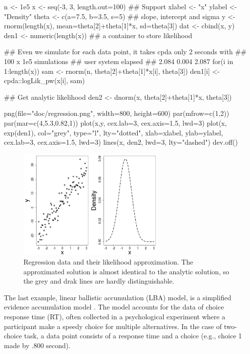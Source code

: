 \documentclass[shortnames,nojss,article]{jss}
\begin{document}
%
\begin{Code}
n      <- 1e5
x      <- seq(-3, 3, length.out=100) ## Support
xlabel <- "x"
ylabel <- "Density"
theta  <- c(a=7.5, b=3.5, s=5)       ## slope, intercept and sigma
y      <- rnorm(length(x), mean=theta[2]+theta[1]*x, sd=theta[3])
dat    <- cbind(x, y)
den1   <- numeric(length(x))         ## a container to store likelihood

## Even we simulate for each data point, it takes cpda only 2 seconds with
## 100 x 1e5 simulations
##   user  system elapsed
##  2.084   0.004   2.087
for(i in 1:length(x)) {
  sam     <- rnorm(n, theta[2]+theta[1]*x[i], theta[3])
  den1[i] <- cpda::logLik_pw(x[i], sam)
}

## Get analytic likelihood
den2 <- dnorm(x, theta[2]+theta[1]*x, theta[3])


png(file="doc/regression.png", width=800, height=600)
par(mfrow=c(1,2))
par(mar=c(4,5.3,0.82,1))
plot(x,y, cex.lab=3, cex.axis=1.5, lwd=3)
plot(x, exp(den1),  col="grey", type="l", lty="dotted", xlab=xlabel,
  ylab=ylabel, cex.lab=3, cex.axis=1.5, lwd=3)
lines(x, den2, lwd=3, lty="dashed")
dev.off()

\end{Code}
%

\begin{figure}[htbp]
\begin{center}
    \includegraphics[width=0.65\textwidth]{figs/regression}
      \caption{Regression data and their likelihood approximation. The
      approximated solution is almost identical to the analytic solution,
      so the grey and drak lines are hardly distinguishable.}
      \label{fig:regression}
\end{center}
\end{figure}


The last example, linear ballistic accumulation (LBA) model, is a simplified
evidence accumulation model \citep{brown_simplest_2008}. The model
accounts for the data of choice response time (RT), often collected in a
psychological experiment where a participant make a speedy choice for multiple
alternatives.  In the case of two-choice task, a data point consists of a
response time and a choice (e.g., choice 1 made by .800 second).
\end{document}
